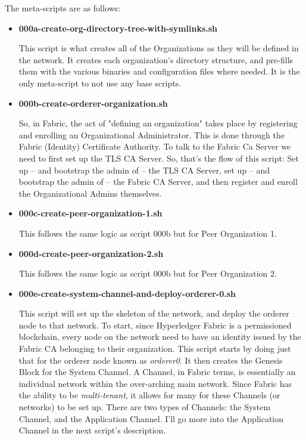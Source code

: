 		The meta-scripts are as follows:
			\begin{itemize}
				\item \textbf{000a-create-org-directory-tree-with-symlinks.sh}
				
					\hspace{10mm}This script is what creates all of the Organizations as they will be defined in the network. It creates each organization's directory structure, and pre-fills them with the various binaries and configuration files where needed. It is the only meta-script to not use any base scripts.
					
				\item \textbf{000b-create-orderer-organization.sh}
				
					\hspace{10mm}So, in Fabric, the act of "defining an organization" takes place by registering and enrolling an Organizational Administrator. This is done through the Fabric (Identity) Certificate Authority. To talk to the Fabric Ca Server we need to first set up the TLS CA Server. So, that's the flow of this script: Set up -- and bootstrap the admin of -- the TLS CA Server, set up -- and bootstrap the admin of -- the Fabric CA Server, and then register and enroll the Organizational Admins themselves.
					
				\item \textbf{000c-create-peer-organization-1.sh}
				
					\hspace{10mm}This follows the same logic as script 000b but for Peer Organization 1.
					
				\item \textbf{000d-create-peer-organization-2.sh}
				
					\hspace{10mm}This follows the same logic as script 000b but for Peer Organization 2.
					
				\item \textbf{000e-create-system-channel-and-deploy-orderer-0.sh}
				
					\hspace{10mm}This script will set up the skeleton of the network, and deploy the orderer node to that network. To start, since Hyperledger Fabric is a permissioned blockchain, every node on the network need to have an identity issued by the Fabric CA belonging to their organization. This script starts by doing just that for the orderer node known as \textit{orderer0}. It then creates the Genesis Block for the System Channel. A Channel, in Fabric terms, is essentially an individual network within the over-arching main network. Since Fabric has the ability to be \textit{multi-tenant}, it allows for many for these Channels (or networks) to be set up. There are two types of Channels: the System Channel, and the Application Channel. I'll go more into the Application Channel in the next script's description.\\
					

\end{itemize}
